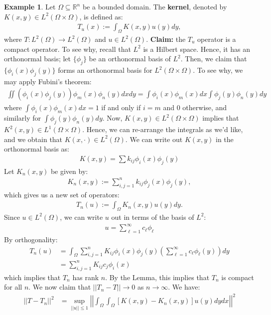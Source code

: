 \documentclass[psamsfonts]{amsart}
\theoremstyle{definition}
\newtheorem{exmp}[thm]{Example}
\theoremstyle{remark}
\newcommand{\R}[0]{\mathbb{R}}
\numberwithin{equation}{section}
\begin{document}
\begin{exmp}
	Let \( \Omega \subseteq \R^n \) be a bounded domain. The \textbf{kernel}, denoted by \( K(x,y) \in L^2(\Omega \times \Omega) \), is defined as:
	\begin{align*}
		T_u(x) := \int_\Omega K(x,y)u(y) dy,
	\end{align*}
	where \( T: L^2(\Omega) \rightarrow L^2(\Omega) \) and \( u \in L^2(\Omega) \). 
	\newline
	\newline
	\textbf{Claim:} the \( T_u \) operator is a compact operator. To see why, recall that \( L^2 \) is a Hilbert space. Hence, it has an orthonormal basis; let \( \{ \phi_j \} \) be an orthonormal basis of \( L^2 \). Then, we claim that \( \{ \phi_i (x) \phi_j(y) \} \) forms an orthonormal basis for \( L^2(\Omega \times \Omega) \). To see why, we may apply Fubini's theorem:
	\begin{align*}
		\iint (\phi_i(x) \phi_j(y) ) \phi_m(x) \phi_n(y) dx dy = \int \phi_i(x) \phi_m(x) dx \int \phi_j(y) \phi_n(y) dy 
	\end{align*}
	where \( \int \phi_i(x) \phi_m(x) dx = 1 \) if and only if \( i = m \) and \( 0 \) otherwise, and similarly for \( \int \phi_j(y) \phi_n(y) dy  \).
	\newline
	\newline
	Now, \( K(x,y) \in L^2(\Omega \times \Omega) \) implies that \( K^2(x,y) \in L^1(\Omega \times \Omega) \). Hence, we can re-arrange the integrals as we'd like, and we obtain that \( K(x, \cdot ) \in L^2 (\Omega) \). We can write out \( K(x,y) \) in the orthonormal basis as:
	\begin{align*}
		K(x,y) = \sum k_{ij} \phi_i(x) \phi_j(y) 
	\end{align*}
	Let \( K_n(x,y) \) be given by:
	\begin{align*}
		K_n(x,y) := \sum_{i,j= 1}^n k_{ij} \phi_j(x) \phi_j(y), 
	\end{align*}
	which gives us a new set of operators:
	\begin{align*}
		T_n(u) := \int_{\Omega} K_n(x,y) u(y) dy.
	\end{align*}
	Since \( u \in L^2(\Omega) \), we can write \( u \) out in terms of the basis of \(L^2 \):
	\begin{align*}
		u = \sum_{\ell = 1}^\infty c_\ell \phi_\ell 
	\end{align*}
	By orthogonality:
	\begin{align*}
		T_n(u) & = \int_\Omega \sum_{i, j = 1}^n K_{ij} \phi_i(x) \phi_j(y) \left( \sum_{\ell = 1}^\infty c_\ell \phi_\ell (y) \right) dy \\
		& = \sum_{i, j = 1}^n K_{ij} c_j \phi_i(x) 
	\end{align*}
	which implies that \( T_n \) has rank \( n \). By the Lemma, this implies that \( T_n \) is compact for all \( n\). We now claim that \( ||T_n - T|| \rightarrow 0 \) as \( n \rightarrow \infty \). We have:
	\begin{align*}
		||T - T_n||^2 & = \sup_{||u|| \leq 1 } \left| \left| \int_\Omega \int_\Omega [K(x,y) - K_n(x,y)]u(y) dy dx \right| \right|^2 
	\end{align*}
\end{exmp}
\end{document}
